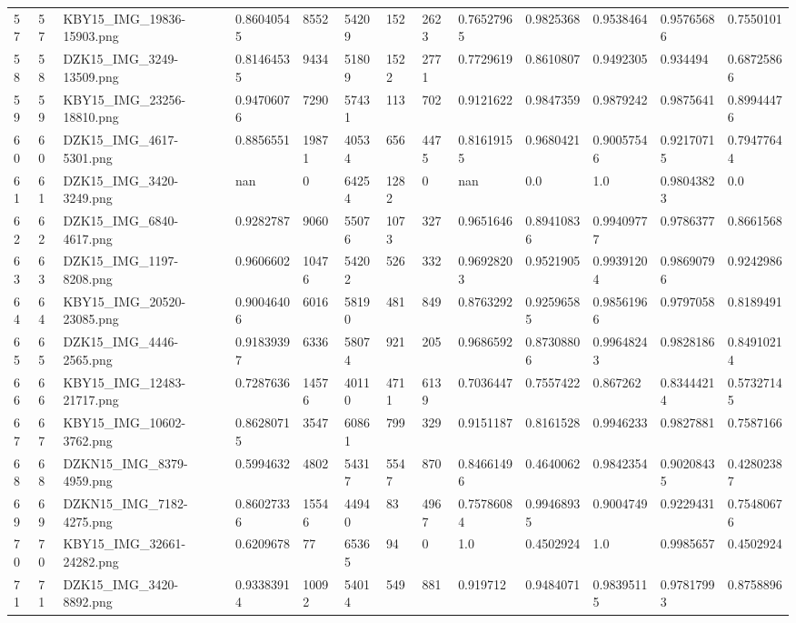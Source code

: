 \documentclass[11pt, a4paper, twoside]{report}
\begin{document}
\begin{longtable}[c]{@{}lllllllllllll@{}}
57 & 57 & KBY15\_IMG\_19836-15903.png & 0.86040545 & 8552 & 54209 & 152 & 2623 & 0.76527965 & 0.9825368 & 0.9538464 & 0.95765686 & 0.7550101 \\
58 & 58 & DZK15\_IMG\_3249-13509.png & 0.81464535 & 9434 & 51809 & 1522 & 2771 & 0.7729619 & 0.8610807 & 0.9492305 & 0.934494 & 0.68725866 \\
59 & 59 & KBY15\_IMG\_23256-18810.png & 0.94706076 & 7290 & 57431 & 113 & 702 & 0.9121622 & 0.9847359 & 0.9879242 & 0.9875641 & 0.89944476 \\
60 & 60 & DZK15\_IMG\_4617-5301.png & 0.8856551 & 19871 & 40534 & 656 & 4475 & 0.81619155 & 0.9680421 & 0.90057546 & 0.92170715 & 0.79477644 \\
61 & 61 & DZK15\_IMG\_3420-3249.png & nan & 0 & 64254 & 1282 & 0 & nan & 0.0 & 1.0 & 0.98043823 & 0.0 \\
62 & 62 & DZK15\_IMG\_6840-4617.png & 0.9282787 & 9060 & 55076 & 1073 & 327 & 0.9651646 & 0.89410836 & 0.99409777 & 0.9786377 & 0.8661568 \\
63 & 63 & DZK15\_IMG\_1197-8208.png & 0.9606602 & 10476 & 54202 & 526 & 332 & 0.96928203 & 0.9521905 & 0.99391204 & 0.98690796 & 0.9242986 \\
64 & 64 & KBY15\_IMG\_20520-23085.png & 0.90046406 & 6016 & 58190 & 481 & 849 & 0.8763292 & 0.92596585 & 0.98561966 & 0.9797058 & 0.8189491 \\
65 & 65 & DZK15\_IMG\_4446-2565.png & 0.91839397 & 6336 & 58074 & 921 & 205 & 0.9686592 & 0.87308806 & 0.99648243 & 0.9828186 & 0.84910214 \\
66 & 66 & KBY15\_IMG\_12483-21717.png & 0.7287636 & 14576 & 40110 & 4711 & 6139 & 0.7036447 & 0.7557422 & 0.867262 & 0.83444214 & 0.57327145 \\
67 & 67 & KBY15\_IMG\_10602-3762.png & 0.86280715 & 3547 & 60861 & 799 & 329 & 0.9151187 & 0.8161528 & 0.9946233 & 0.9827881 & 0.7587166 \\
68 & 68 & DZKN15\_IMG\_8379-4959.png & 0.5994632 & 4802 & 54317 & 5547 & 870 & 0.84661496 & 0.4640062 & 0.9842354 & 0.90208435 & 0.42802387 \\
69 & 69 & DZKN15\_IMG\_7182-4275.png & 0.86027336 & 15546 & 44940 & 83 & 4967 & 0.75786084 & 0.99468935 & 0.9004749 & 0.9229431 & 0.75480676 \\
70 & 70 & KBY15\_IMG\_32661-24282.png & 0.6209678 & 77 & 65365 & 94 & 0 & 1.0 & 0.4502924 & 1.0 & 0.9985657 & 0.4502924 \\
71 & 71 & DZK15\_IMG\_3420-8892.png & 0.93383914 & 10092 & 54014 & 549 & 881 & 0.919712 & 0.9484071 & 0.98395115 & 0.97817993 & 0.8758896 \\

\end{longtable}
\end{document}
